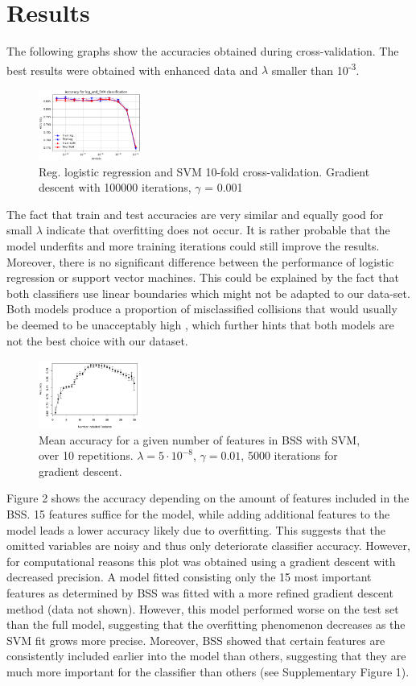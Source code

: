 \documentclass[10pt,conference,compsocconf]{IEEEtran}
\begin{document}
\section*{Results}
The following graphs show the accuracies obtained during cross-validation. The best results were obtained with enhanced data and $\lambda$ smaller than 10\textsuperscript{-3}. 
\begin{figure}[H]
	\centering
	\includegraphics[width=0.3\textwidth]{accuracy_log_and_SVM.png}
	\caption{Reg. logistic regression and SVM 10-fold cross-validation. Gradient descent with 100000 iterations, $\gamma$ = 0.001}
\end{figure}
The fact that train and test accuracies are very similar and equally good for small $\lambda$ indicate that overfitting does not occur. It is rather probable that the model underfits and more training iterations could still improve the results. Moreover, there is no significant difference between the performance of logistic regression or support vector machines. This could be explained by the fact that both classifiers use linear boundaries which might not be adapted to our data-set. Both models produce a proportion of misclassified collisions that would usually be deemed to be unacceptably high \cite{advice}, which further hints that both models are not the best choice with our dataset.
\par
\begin{figure}[H]
	\centering
	\includegraphics[width=0.3\textwidth]{accuracy_plot.pdf}
	\caption{Mean accuracy for a given number of features in BSS with SVM, over 10 repetitions. $\lambda = 5 \cdot 10^{-8}$, $\gamma = 0.01$, 5000 iterations for gradient descent.}
\end{figure}
Figure 2 shows the accuracy depending on the amount of features included in the BSS. 15 features suffice for the model, while adding additional features to the model leads a lower accuracy likely due to overfitting. This suggests that the omitted variables are noisy and thus only deteriorate classifier accuracy.
However, for computational reasons this plot was obtained using a gradient descent with decreased precision. A model fitted consisting only the 15 most important features as determined by BSS was fitted with a more refined gradient descent method (data not shown). However, this model performed worse on the test set than the full model, suggesting that the overfitting phenomenon decreases as the SVM fit grows more precise.
Moreover, BSS showed that certain features are consistently included earlier into the model than others, suggesting that they are much more important for the classifier than others (see Supplementary Figure 1). 
\end{document}

